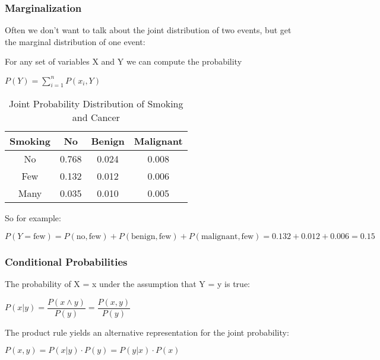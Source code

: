 \documentclass[
../../EiKI_Summary.tex,
]
{subfiles}
\begin{document}
\subsubsection{Marginalization}
Often we don't want to talk about the joint distribution of two events, but get the marginal distribution of one event: 

For any set of variables X and Y we can compute the probability 

\begin{csmb*}
    $\displaystyle P(Y) = \sum_{i=1}^{n} P(x_i,Y)$
\end{csmb*}

\begin{table}[H]
    \centering
    \renewcommand{\arraystretch}{1.3}
    \begin{tabular}{|c|ccc|}
        \hline
        \textbf{Smoking} & \textbf{No} & \textbf{Benign} & \textbf{Malignant} \\
        \hline
        No   & 0.768  & 0.024  & 0.008  \\
        Few  & 0.132  & 0.012  & 0.006  \\
        Many & 0.035  & 0.010  & 0.005  \\
        \hline
    \end{tabular}
    \caption{Joint Probability Distribution of Smoking and Cancer}
\end{table}

So for example:

\begin{csmb*}
    $P(Y = \text{few}) = P(\text{no}, \text{few}) + P(\text{benign}, \text{few}) + P(\text{malignant}, \text{few}) = 0.132 + 0.012 + 0.006 = 0.15$
\end{csmb*}

\subsubsection{Conditional Probabilities}
The probability of X = x under the assumption that Y = y is true:

\begin{csmb*}
    $P(x|y) = \dfrac{P(x \land y)}{P(y)} = \dfrac{P(x,y)}{P(y)}$
\end{csmb*}

The product rule yields an alternative representation for the joint probability:

\begin{csmb*}
    $P(x,y) = P(x|y) \cdot P(y) = P(y|x) \cdot P(x)$
\end{csmb*}
\end{document}
